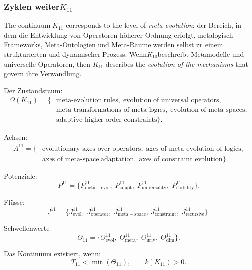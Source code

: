 
\subsubsection{Zyklen weiter$K_{11}$}
\label{sec:cycles-k11}

The continuum $K_{11}$ corresponds to the level of \emph{meta-evolution}:
der Bereich, in dem die Entwicklung von Operatoren höherer Ordnung erfolgt, metalogisch
Frameworks, Meta-Ontologien und Meta-Räume werden selbst zu einem strukturierten und
dynamischer Prozess. Wenn$K_{10}$beschreibt Metamodelle und universelle Operatoren,
then $K_{11}$ describes the \emph{evolution of the mechanisms} that govern
ihre Verwandlung.

Der Zustandsraum:
\[
  \begin{aligned}
  \Omega(K_{11})
  = \{&
    \text{meta-evolution rules},\;
    \text{evolution of universal operators},\\
    &\text{meta-transformations of meta-logics},\;
    \text{evolution of meta-spaces},\\
    &\text{adaptive higher-order constraints}
  \}.
  \end{aligned}
\]

Achsen:
\[
  \begin{aligned}
A^{11}
  = \{&
      \text{evolutionary axes over operators},\;
      \text{axes of meta-evolution of logics},\\
      &\text{axes of meta-space adaptation},\;
      \text{axes of constraint evolution}
    \}.
  \end{aligned}
\]

Potenziale:
\[
P^{11}
  = \{
      P^{11}_{\mathrm{meta\!-\!evol}},\;
      P^{11}_{\mathrm{adapt}},\;
      P^{11}_{\mathrm{universality}},\;
      P^{11}_{\mathrm{stability}}
    \}.
\]

Flüsse:
\[
J^{11}
  = \{
      J^{11}_{\mathrm{evol}},\;
      J^{11}_{\mathrm{operator}},\;
      J^{11}_{\mathrm{meta\!-\!space}},\;
      J^{11}_{\mathrm{constraint}},\;
      J^{11}_{\mathrm{recursive}}
    \}.
\]

Schwellenwerte:
\[
  \Theta_{11}
   =
   \{
     \Theta^{11}_{\mathrm{evol}},\;
     \Theta^{11}_{\mathrm{meta}},\;
     \Theta^{11}_{\mathrm{univ}},\;
     \Theta^{11}_{\mathrm{dim}}
   \}.
\]

Das Kontinuum existiert, wenn:
\[
  T_{11} < \min(\Theta_{11}), \qquad k(K_{11})>0.
\]


